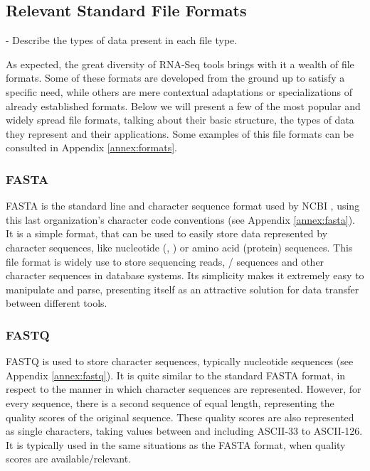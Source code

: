 \subsection{Relevant Standard File Formats}\label{sec:formats}

\begin{Notes}
- Describe the types of data present in each file type.\\
\end{Notes}

As expected, the great diversity of RNA-Seq tools brings with it a wealth of
file formats. Some of these formats are developed from the ground up to satisfy
a specific need, while others are mere contextual adaptations or specializations
of already established formats. Below we will present a few of the most popular
and widely spread file formats, talking about their basic structure, the types
of data they represent and their applications. Some examples of this file
formats can be consulted in Appendix \ref{annex:formats}.

\subsubsection*{FASTA}

FASTA is the standard line and character sequence format used by NCBI
\cite{ncbi:fasta}, using this last organization's character code conventions
(see Appendix \ref{annex:fasta}). It is a simple format, that can be used to
easily store data represented by character sequences, like nucleotide (\dna,
\rna) or amino acid (protein) sequences. This file format is widely use to store
sequencing reads, \dna/\rna{} sequences and other character sequences in
database systems. Its simplicity makes it extremely easy to manipulate and
parse, presenting itself as an attractive solution for data transfer between
different tools.

\subsubsection*{FASTQ}

FASTQ is used to store character sequences, typically nucleotide sequences
\cite{Cock2010} (see Appendix \ref{annex:fastq}). It is quite similar to the
standard FASTA format, in respect to the manner in which character sequences are
represented. However, for every sequence, there is a second sequence of equal
length, representing the quality scores of the original sequence. These quality
scores are also represented as single characters, taking values between and
including ASCII-33 to ASCII-126. It is typically used in the same situations as
the FASTA format, when quality scores are available/relevant.

